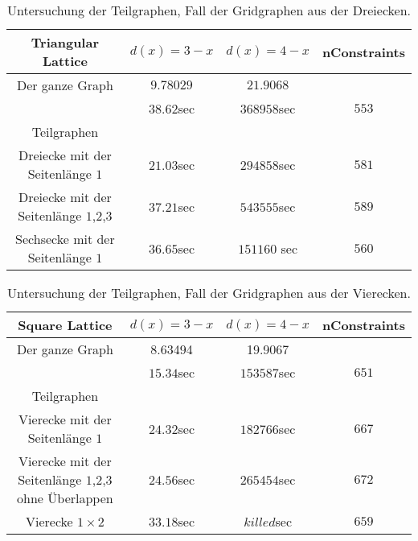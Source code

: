 \documentclass[
	fontsize=12pt,
	paper=a4,
	twoside=false,
	numbers=noenddot,
	plainheadsepline,
	toc=listof,
	toc=bibliography
]{scrartcl}
\begin{document}
\begin{table}[htbp]
\centering
\begin{tabular}{|c|c|c|c|}
		\hline 
		
		Triangular Lattice  & $d(x)=3-x$    & $d(x)=4-x$   & nConstraints \\ \hline 
		Der ganze Graph     & $9.78029$	 & $21.9068$    &              \\ 
			                & $38.62$sec    & $368958$sec  & $553$        \\ \hline
			                
		Teilgraphen & & &\\\hline
		Dreiecke mit der Seitenlänge $1$         & $21.03$sec	 & $294858$sec    & $581$\\ \hline
		Dreiecke mit der Seitenlänge $1$,$2$,$3$ & $37.21$sec	 & $543555$sec    & $589$\\ \hline
		Sechsecke mit der Seitenlänge $1$        & $36.65$sec  & $151160$ sec   & $560$ \\ \hline

\end{tabular}
\caption{Untersuchung der Teilgraphen, Fall der Gridgraphen aus der Dreiecken.}
\label{Table:TG2}
\end{table}
	
	
\begin{table}[htbp]
\centering
\begin{tabular}{|c|c|c|c|}
	\hline
	 
	 Square Lattice       & $d(x)=3-x$  & $d(x)=4-x$   & nConstraints  \\ \hline 
	 Der ganze Graph	   & 8.63494	 & 19.9067      &               \\ 
			              & $15.34$sec	 & $153587$sec  & $651$\\ \hline
			              
	Teilgraphen & & &\\ \hline
	Vierecke mit der Seitenlänge $1$                         & $24.32$sec	  & $182766$sec & $667$\\ \hline
	Vierecke mit der Seitenlänge $1$,$2$,$3$ ohne Überlappen & $24.56$sec   & $265454$sec & $672$\\ \hline
	Vierecke $1\times 2$                                     & $33.18$sec   & $killed$sec & $659$\\ \hline

\end{tabular}
\caption{Untersuchung der Teilgraphen, Fall der Gridgraphen aus der Vierecken.} 
\label{Table:TG3}
\end{table}
	
\end{document}
